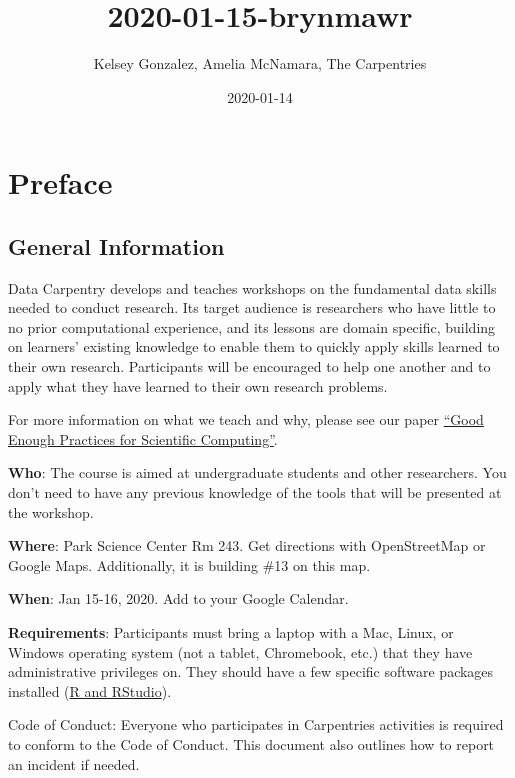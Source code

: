 \documentclass[]{book}
\title{2020-01-15-brynmawr}
\author{Kelsey Gonzalez, Amelia McNamara, The Carpentries}
\date{2020-01-14}
\begin{document}
\maketitle

{
\setcounter{tocdepth}{1}
\tableofcontents
}
\chapter*{Preface}\label{preface}

\section{General Information}\label{general-information}

Data Carpentry develops and teaches workshops on the fundamental data
skills needed to conduct research. Its target audience is researchers
who have little to no prior computational experience, and its lessons
are domain specific, building on learners' existing knowledge to enable
them to quickly apply skills learned to their own research. Participants
will be encouraged to help one another and to apply what they have
learned to their own research problems.

For more information on what we teach and why, please see our paper
\href{https://journals.plos.org/ploscompbiol/article?id=10.1371/journal.pcbi.1005510}{``Good
Enough Practices for Scientific Computing''}.

\textbf{Who}: The course is aimed at undergraduate students and other
researchers. You don't need to have any previous knowledge of the tools
that will be presented at the workshop.

\textbf{Where}: Park Science Center Rm 243. Get directions with
OpenStreetMap or Google Maps. Additionally, it is building \#13 on this
map.

\textbf{When}: Jan 15-16, 2020. Add to your Google Calendar.

\textbf{Requirements}: Participants must bring a laptop with a Mac,
Linux, or Windows operating system (not a tablet, Chromebook, etc.) that
they have administrative privileges on. They should have a few specific
software packages installed
(\href{https://datacarpentry.org/r-socialsci/setup.html}{R and
RStudio}).

Code of Conduct: Everyone who participates in Carpentries activities is
required to conform to the Code of Conduct. This document also outlines
how to report an incident if needed.
\end{document}
